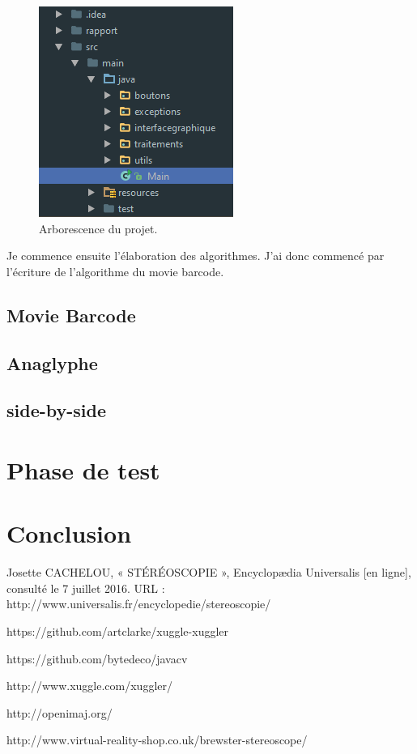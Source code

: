 \documentclass[10pt,a4paper]{article}
\begin{document}
\begin{figure}[!h]
\center
\includegraphics[scale = 1]{tree.PNG}
\caption{Arborescence du projet.}
\end{figure}

Je commence ensuite l'élaboration des algorithmes. J'ai donc commencé par l'écriture de l'algorithme du movie barcode.
\subsection{Movie Barcode}

\subsection{Anaglyphe}

\subsection{side-by-side}



\section{Phase de test}

\section{Conclusion}

Josette CACHELOU, « STÉRÉOSCOPIE  », Encyclopædia Universalis [en ligne], consulté le 7 juillet 2016. URL : http://www.universalis.fr/encyclopedie/stereoscopie/

https://github.com/artclarke/xuggle-xuggler

https://github.com/bytedeco/javacv

http://www.xuggle.com/xuggler/

http://openimaj.org/

http://www.virtual-reality-shop.co.uk/brewster-stereoscope/
\end{document}
